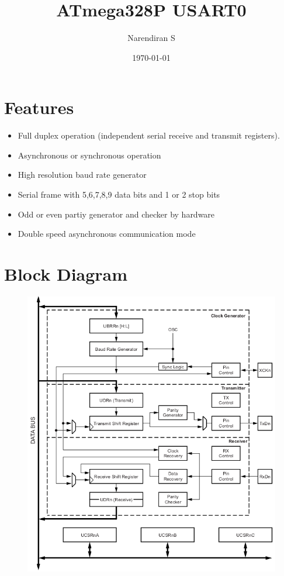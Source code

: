 \documentclass{article}
\title{ATmega328P USART0}
\author{Narendiran S}
\date{\today}
\begin{document}
\maketitle

\section{Features}
\begin{itemize}
    \item Full duplex operation (independent serial receive and transmit registers).
    \item Asynchronous or synchronous operation
    \item High resolution baud rate generator
    \item Serial frame with 5,6,7,8,9 data bits and 1 or 2 stop bits
    \item Odd or even partiy generator and checker by hardware
    \item Double speed asynchronous communication mode
\end{itemize}
\section{Block Diagram}
\begin{figure}[H]
    \centering
    \includegraphics[height=0.58\textheight]{USART0BlockDiagram.png}
\end{figure}
\end{document}
